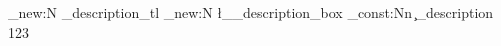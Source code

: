 \tl_new:N
  \g_description_tl  %
\box_new:N
  \l__description_box  %
\int_const:Nn
  \c_description  %
  { 123 }
